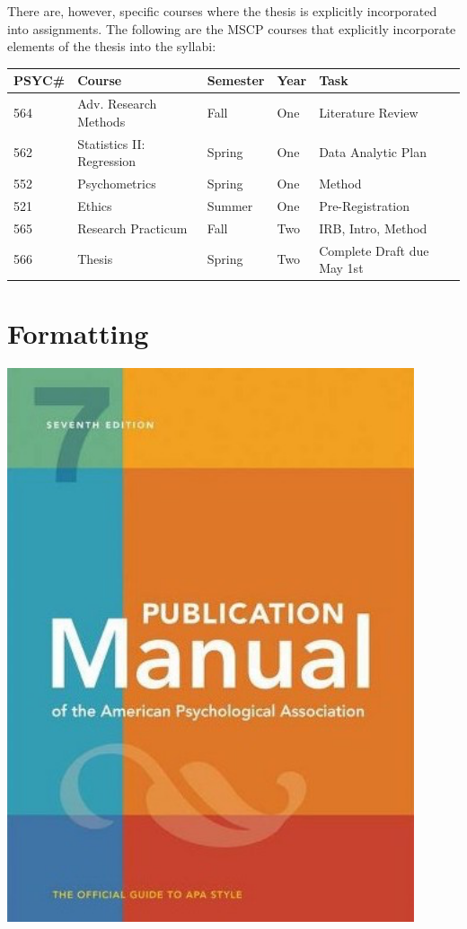 \documentclass[openany]{book}
\begin{document}
There are, however, specific courses where the thesis is explicitly incorporated into assignments. The following are the MSCP courses that explicitly incorporate elements of the thesis into the syllabi:

\begin{longtable}[]{@{}lllll@{}}
\toprule
PSYC\# & Course & Semester & Year & Task\tabularnewline
\midrule
\endhead
564 & Adv. Research Methods & Fall & One & Literature Review\tabularnewline
562 & Statistics II: Regression & Spring & One & Data Analytic Plan\tabularnewline
552 & Psychometrics & Spring & One & Method\tabularnewline
521 & Ethics & Summer & One & Pre-Registration\tabularnewline
565 & Research Practicum & Fall & Two & IRB, Intro, Method\tabularnewline
566 & Thesis & Spring & Two & Complete Draft due May 1st\tabularnewline
\bottomrule
\end{longtable}

\hypertarget{formatting}{%
\chapter{Formatting}\label{formatting}}

\includegraphics[width=4.72in]{images/apamanual}
\end{document}

